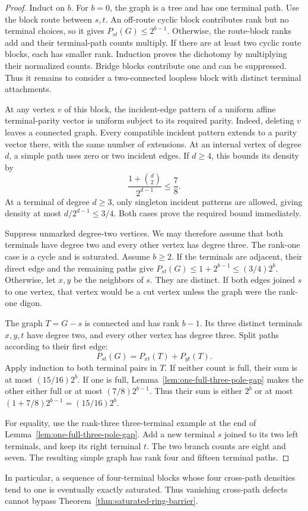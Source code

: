 \begin{proof}
Induct on $b$.
For $b=0$, the graph is a tree and has one terminal path.
Use the block route between $s,t$.
An off-route cyclic block contributes rank but no terminal choices, so it gives $P_{st}(G)\le2^{b-1}$.
Otherwise, the route-block ranks add and their terminal-path counts multiply.
If there are at least two cyclic route blocks, each has smaller rank.
Induction proves the dichotomy by multiplying their normalized counts.
Bridge blocks contribute one and can be suppressed.
Thus it remains to consider a two-connected loopless block with distinct terminal attachments.

At any vertex $v$ of this block, the incident-edge pattern of a uniform affine terminal-parity vector is uniform subject to its required parity.
Indeed, deleting $v$ leaves a connected graph.
Every compatible incident pattern extends to a parity vector there, with the same number of extensions.
At an internal vertex of degree $d$, a simple path uses zero or two incident edges.
If $d\ge4$, this bounds its density by
\[
 \frac{1+\binom d2}{2^{d-1}}\le\frac78.
\]
At a terminal of degree $d\ge3$, only singleton incident patterns are allowed, giving density at most
$d/2^{d-1}\le3/4$.
Both cases prove the required bound immediately.

Suppress unmarked degree-two vertices.
We may therefore assume that both terminals have degree two and every other vertex has degree three.
The rank-one case is a cycle and is saturated.
Assume $b\ge2$.
If the terminals are adjacent, their direct edge and the remaining paths give
$P_{st}(G)\le1+2^{b-1}\le(3/4)2^b$.
Otherwise, let $x,y$ be the neighbors of $s$.
They are distinct.
If both edges joined $s$ to one vertex, that vertex would be a cut vertex unless the graph were the rank-one digon.

The graph $T=G-s$ is connected and has rank $b-1$.
Its three distinct terminals $x,y,t$ have degree two, and every other vertex has degree three.
Split paths according to their first edge:
\[
 P_{st}(G)=P_{xt}(T)+P_{yt}(T).
\]
Apply induction to both terminal pairs in $T$.
If neither count is full, their sum is at most $(15/16)2^b$.
If one is full, Lemma~\ref{lem:one-full-three-pole-gap} makes the other either full or at most $(7/8)2^{b-1}$.
Thus their sum is either $2^b$ or at most
$(1+7/8)2^{b-1}=(15/16)2^b$.

For equality, use the rank-three three-terminal example at the end of Lemma~\ref{lem:one-full-three-pole-gap}.
Add a new terminal $s$ joined to its two left terminals, and keep its right terminal $t$.
The two branch counts are eight and seven.
The resulting simple graph has rank four and fifteen terminal paths.
\end{proof}

In particular, a sequence of four-terminal blocks whose four cross-path densities tend to one is eventually exactly saturated.
Thus vanishing cross-path defects cannot bypass Theorem~\ref{thm:saturated-ring-barrier}.

